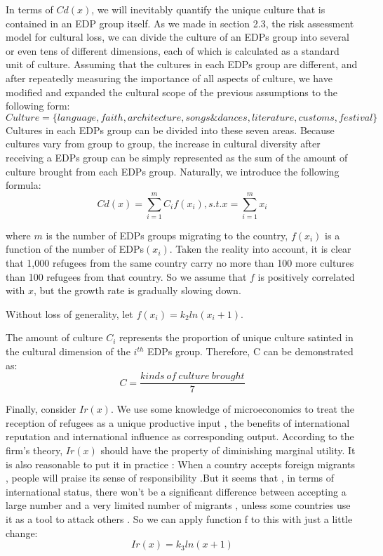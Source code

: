 \documentclass{mcmthesis}
\begin{document}
In terms of $Cd(x)$, we will inevitably quantify the unique culture that is contained in an EDP group itself. As we made in section 2.3, the risk assessment model for cultural loss, we can divide the culture of an EDPs group into several or even tens of different dimensions, each of which is calculated as a standard unit of culture. 
Assuming that the cultures in each EDPs group are different, and after repeatedly measuring the importance of all aspects of culture, we have modified and expanded the cultural scope of the previous assumptions to the following form:
$ Culture = \{ language, faith, architecture, songs \& dances, literature, customs, festival \} $
Cultures in each EDPs group can be divided into these seven areas. Because cultures vary from group to group, the increase in cultural diversity after receiving a EDPs group can be simply represented as the sum of the amount of culture brought from each EDPs group. Naturally, we introduce the following formula:
\begin{equation}
Cd(x)=\sum_{i=1}^{m}C_{i}f(x_{i}),s.t.x=\sum_{i=1}^{m}x_{i}
\end{equation}

where $m$ is the number of EDPs groups migrating to the country, $f(x_{i})$ is a function of the number of EDPs$ (x_{i}) $.  Taken the reality into account, it is clear that 1,000 refugees from the same country carry no more than 100 more cultures than 100 refugees from that country.  So we assume that  $f$  is positively correlated with $x$, but the growth rate is gradually slowing down. 

Without loss of generality, let $ f(x_{i})=k_{2}ln(x_i+1) $. 

The amount of culture $ C_{i} $ represents the proportion of unique culture satinted in the cultural dimension of the $ i^{th} $ EDPs group. Therefore, C can be demonstrated as:
\begin{equation}
C=\dfrac{kinds\ of\ culture\ brought}{7}
\end{equation}

Finally, consider $ Ir(x) $. We use some knowledge of microeconomics to treat the reception of refugees as a unique productive input , the benefits of international reputation and international influence as corresponding output. According to the firm's theory, $ Ir(x) $ should have the property of diminishing marginal utility. It is also reasonable to put it in practice : When a country accepts foreign migrants , people will praise its sense of responsibility .But it seems that , in terms of international status, there won't be a significant difference between accepting a large number and a very limited number of migrants , unless some countries use it as a tool to attack others . So we can apply function f to this with just a little change:
\begin{equation}
Ir(x)=k_{3}ln(x+1)
\end{equation}
\end{document}
